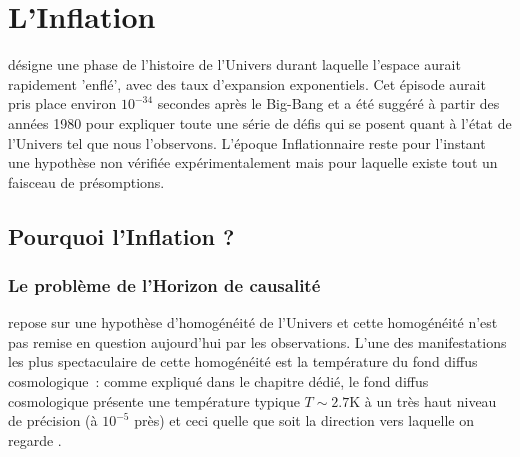 \chapter{L'Inflation}
 désigne une phase de l'histoire de l'Univers durant laquelle l'espace aurait rapidement 'enflé', avec des taux d'expansion exponentiels. Cet épisode aurait pris place environ $10^{-34}$ secondes après le Big-Bang et a été suggéré à partir des années 1980 pour expliquer toute une série de défis qui se posent quant à l'état de l'Univers tel que nous l'observons. L'époque Inflationnaire reste pour l'instant une hypothèse non vérifiée expérimentalement mais pour laquelle existe tout un faisceau de présomptions.

\section{Pourquoi l'Inflation ?}
\subsection{Le problème de l'Horizon de causalité}
 repose sur une hypothèse d'homogénéité de l'Univers et cette homogénéité n'est pas remise en question aujourd'hui par les observations. L'une des manifestations les plus spectaculaire de cette homogénéité est la température du fond diffus cosmologique~: comme expliqué dans le chapitre dédié, le fond diffus cosmologique présente une température typique $T\sim 2.7 $K à un très haut niveau de précision (à $10^{-5}$ près) et ceci quelle que soit la direction vers laquelle on regarde . 

